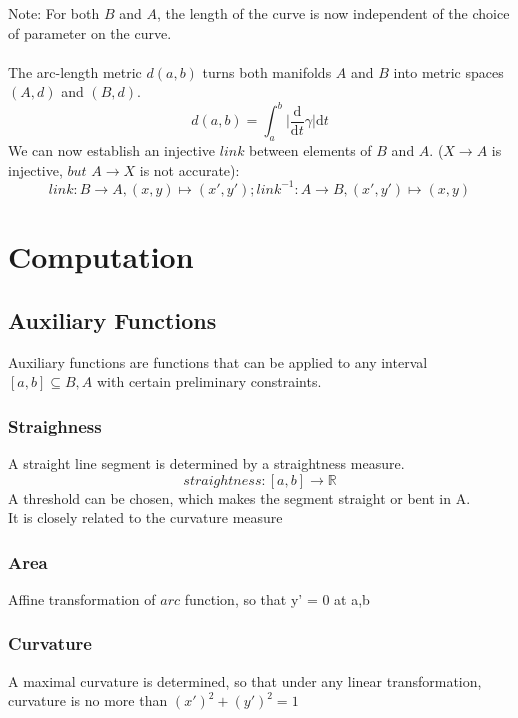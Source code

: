 \documentclass{article}
\begin{document}
Note: For both $B$ and $A$, the length of the curve is now independent of the choice of parameter on the curve. ~\cite[]{Taimanov}\\\\
The arc-length metric $d(a,b)$ turns both manifolds $A$ and $B$ into metric spaces $(A,d)$ and $(B,d)$.
\begin{equation}
d(a,b) = \int_{a}^{b}\lvert \frac{\mathrm{d}}{\mathrm{d}t}\gamma\rvert \mathrm{d}t
\end{equation}
We can now establish an injective $link$ between elements of $B$ and $A$. ($X \rightarrow A$ is injective, $but$ $A \rightarrow X$ is not accurate):
\begin{equation}
link: B \rightarrow A, (x,y) \mapsto (x',y'); link^{-1}: A \rightarrow B, (x',y') \mapsto (x,y)
\end{equation}
\section{Computation}

\subsection{Auxiliary Functions}

Auxiliary functions are functions that can be applied to any interval $[a,b] \subseteq B,A$ with certain preliminary constraints.

\subsubsection{Straighness}
A straight line segment is determined by a straightness measure.\\
\begin{equation}
straightness: [a,b] \rightarrow \mathbb{R}
\end{equation}
A threshold can be chosen, which makes the segment straight or bent in A.\\
It is closely related to the curvature measure

\subsubsection{Area}
Affine transformation of $arc$ function, so that y' = 0 at a,b

\subsubsection{Curvature}
A maximal curvature is determined, so that under any linear transformation, curvature is no more than $(x')^2 + (y')^2 =1$
\end{document}
